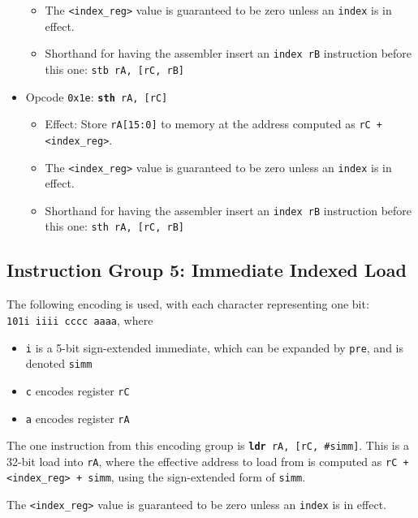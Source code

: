 \documentclass{article}
\begin{document}
\begin{itemize}
\begin{itemize}
			\item The \texttt{<index\_reg>} value is guaranteed to be zero
			unless an \texttt{index} is in effect.
			\item Shorthand for having the assembler insert an
			\texttt{index rB} instruction before this one:
				\texttt{stb rA, [rC, rB]}
		\end{itemize}
		\item Opcode \texttt{0x1e}:
			\texttt{\textbf{sth} rA, [rC]}
		\begin{itemize}
			\item Effect: Store \texttt{rA[15:0]} to memory at the address
			computed as \texttt{rC + <index\_reg>}.
			\item The \texttt{<index\_reg>} value is guaranteed to be zero
			unless an \texttt{index} is in effect.
			\item Shorthand for having the assembler insert an
			\texttt{index rB} instruction before this one:
				\texttt{sth rA, [rC, rB]}
		\end{itemize}

	\end{itemize}

	\doublespacing
	\subsection{Instruction Group 5: Immediate Indexed Load}
	The following encoding is used, with each character representing one
	bit: \\
	\texttt{101i iiii cccc aaaa}, where

	\singlespacing
	\begin{itemize}
		\item \texttt{i} is a 5-bit sign-extended immediate, which can
		be expanded by \texttt{pre}, and is denoted \texttt{simm}
		\item \texttt{c} encodes register \texttt{rC}
		\item \texttt{a} encodes register \texttt{rA}
	\end{itemize}
	\doublespacing

	The one instruction from this encoding group is
	\texttt{\textbf{ldr} rA, [rC, \#simm]}.
	This is a 32-bit load into \texttt{rA}, where the effective address to
	load from is computed as \texttt{rC + <index\_reg> + simm}, using the
	sign-extended form of \texttt{simm}.

	The \texttt{<index\_reg>} value is guaranteed to be zero unless an
	\texttt{index} is in effect.
\end{document}
